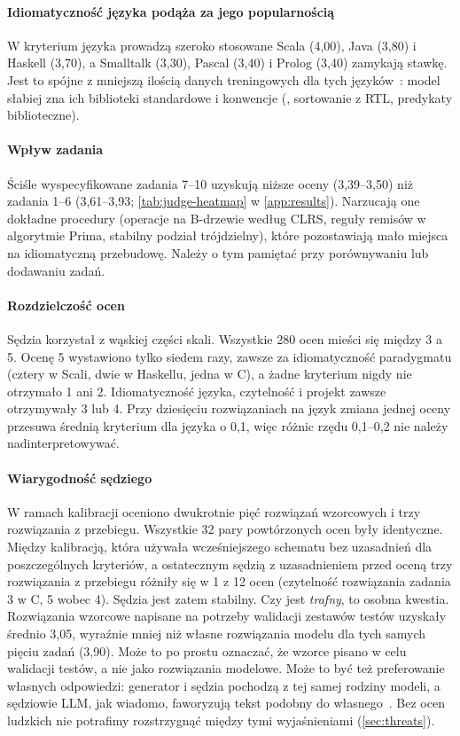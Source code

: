 \paragraph{Idiomatyczność języka podąża za jego popularnością} W kryterium języka prowadzą szeroko
stosowane Scala (4,00), Java (3,80) i Haskell (3,70), a Smalltalk (3,30), Pascal (3,40) i Prolog
(3,40) zamykają stawkę. Jest to spójne z mniejszą ilością danych treningowych dla tych
języków~\cite{cassano2024knowledge}: model słabiej zna ich biblioteki standardowe i konwencje
(, sortowanie z RTL, predykaty biblioteczne).

\paragraph{Wpływ zadania} Ściśle wyspecyfikowane zadania 7--10 uzyskują niższe oceny (3,39--3,50)
niż zadania 1--6 (3,61--3,93; \cref{tab:judge-heatmap} w \cref{app:results}). Narzucają one
dokładne procedury (operacje na B-drzewie według CLRS, reguły remisów w algorytmie Prima, stabilny
podział trójdzielny), które pozostawiają mało miejsca na idiomatyczną przebudowę. Należy o tym
pamiętać przy porównywaniu lub dodawaniu zadań.

\paragraph{Rozdzielczość ocen} Sędzia korzystał z wąskiej części skali. Wszystkie 280 ocen mieści
się między 3 a 5. Ocenę 5 wystawiono tylko siedem razy, zawsze za idiomatyczność paradygmatu (cztery
w Scali, dwie w Haskellu, jedna w C), a żadne kryterium nigdy nie otrzymało 1 ani 2.
Idiomatyczność języka, czytelność i projekt zawsze otrzymywały 3 lub 4. Przy dziesięciu
rozwiązaniach na język zmiana jednej oceny przesuwa średnią kryterium dla języka o 0,1, więc różnic
rzędu 0,1--0,2 nie należy nadinterpretowywać.

\paragraph{Wiarygodność sędziego} W ramach kalibracji oceniono dwukrotnie pięć rozwiązań wzorcowych
i trzy rozwiązania z przebiegu. Wszystkie 32 pary powtórzonych ocen były identyczne. Między
kalibracją, która używała wcześniejszego schematu bez uzasadnień dla poszczególnych kryteriów,
a ostatecznym sędzią z uzasadnieniem przed oceną trzy rozwiązania z przebiegu różniły się w 1 z 12
ocen (czytelność rozwiązania zadania 3 w C, 5 wobec 4). Sędzia jest zatem stabilny. Czy jest
\emph{trafny}, to osobna kwestia. Rozwiązania wzorcowe napisane na potrzeby walidacji zestawów
testów uzyskały średnio 3,05, wyraźnie mniej niż własne rozwiązania modelu \haiku{} dla tych samych
pięciu zadań (3,90). Może to po prostu oznaczać, że wzorce pisano w celu walidacji testów, a nie
jako rozwiązania modelowe. Może to być też preferowanie własnych odpowiedzi: generator i sędzia
pochodzą z tej samej rodziny modeli, a sędziowie LLM, jak wiadomo, faworyzują tekst podobny do
własnego~\cite{panickssery2024selfpreference}. Bez ocen ludzkich nie potrafimy rozstrzygnąć między
tymi wyjaśnieniami (\cref{sec:threats}).

